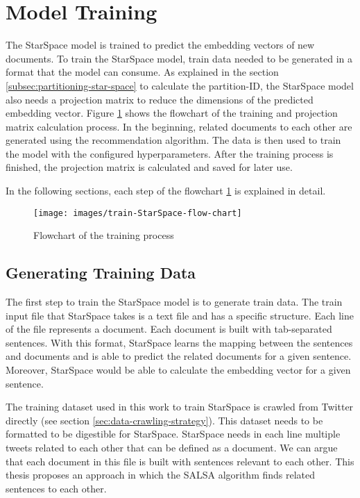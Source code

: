 \section{Model Training}
\label{sec:model-training}
The StarSpace model is trained to predict the embedding vectors of new documents. To train the StarSpace model, train data needed to be generated in a format that the model can consume. As explained in the section \ref{subsec:partitioning-star-space} to calculate the partition-ID, the StarSpace model also needs a projection matrix to reduce the dimensions of the predicted embedding vector. Figure \ref{fig:star-space-training} shows the flowchart of the training and projection matrix calculation process. In the beginning, related documents to each other are generated using the recommendation algorithm. The data is then used to train the model with the configured hyperparameters. After the training process is finished, the projection matrix is calculated and saved for later use.

In the following sections, each step of the flowchart \ref{fig:star-space-training} is explained in detail.

\begin{figure}[!ht]
    \centering
    \texttt{[image: images/train-StarSpace-flow-chart]}
    \caption{Flowchart of the training process}
    \label{fig:star-space-training}
\end{figure}

\subsection{Generating Training Data}
\label{subsec:generating-training-data}
The first step to train the StarSpace model is to generate train data. The train input file that StarSpace takes is a text file and has a specific structure. Each line of the file represents a document. Each document is built with tab-separated sentences. With this format, StarSpace learns the mapping between the sentences and documents and is able to predict the related documents for a given sentence. Moreover, StarSpace would be able to calculate the embedding vector for a given sentence.


The training dataset used in this work to train StarSpace is crawled from Twitter directly (see section \ref{sec:data-crawling-strategy}). This dataset needs to be formatted to be digestible for StarSpace. StarSpace needs in each line multiple tweets related to each other that can be defined as a document. We can argue that each document in this file is built with sentences relevant to each other. This thesis proposes an approach in which the SALSA algorithm finds related sentences to each other.


